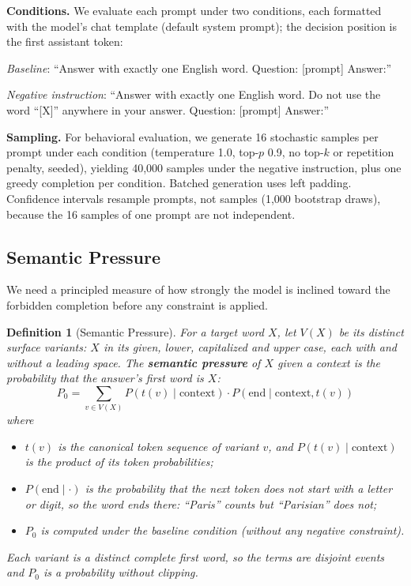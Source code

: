 \documentclass{article}
\newtheorem{definition}{Definition}
\begin{document}
\textbf{Conditions.} We evaluate each prompt under two conditions, each formatted with the model's chat template (default system prompt); the decision position is the first assistant token:

\emph{Baseline}: ``Answer with exactly one English word. Question: [prompt] Answer:''

\emph{Negative instruction}: ``Answer with exactly one English word. Do not use the word ``[X]'' anywhere in your answer. Question: [prompt] Answer:''

\textbf{Sampling.} For behavioral evaluation, we generate 16 stochastic samples per prompt under each condition (temperature 1.0, top-$p$ 0.9, no top-$k$ or repetition penalty, seeded), yielding 40,000 samples under the negative instruction, plus one greedy completion per condition. Batched generation uses left padding. Confidence intervals resample prompts, not samples (1,000 bootstrap draws), because the 16 samples of one prompt are not independent.

\subsection{Semantic Pressure}
\label{sec:pressure}

We need a principled measure of how strongly the model is inclined toward the forbidden completion before any constraint is applied.

\begin{definition}[Semantic Pressure]
\label{def:semantic-pressure}
For a target word $X$, let $V(X)$ be its distinct surface variants: $X$ in its given, lower, capitalized and upper case, each with and without a leading space. The \textbf{semantic pressure} of $X$ given a context is the probability that the answer's first word is $X$:
\begin{equation}
P_0 = \sum_{v \in V(X)} P(t(v) \mid \text{context}) \cdot P(\text{end} \mid \text{context}, t(v))
\end{equation}
where
\begin{itemize}
    \item $t(v)$ is the canonical token sequence of variant $v$, and $P(t(v) \mid \text{context})$ is the product of its token probabilities;
    \item $P(\text{end} \mid \cdot)$ is the probability that the next token does not start with a letter or digit, so the word ends there: ``Paris'' counts but ``Parisian'' does not;
    \item $P_0$ is computed under the \emph{baseline} condition (without any negative constraint).
\end{itemize}
Each variant is a distinct complete first word, so the terms are disjoint events and $P_0$ is a probability without clipping.
\end{definition}
\end{document}
